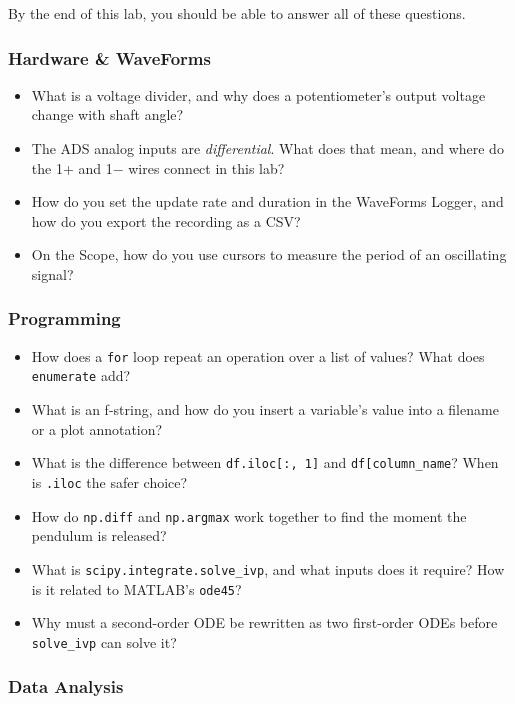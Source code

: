 \documentclass[
  12pt,
  letterpaper,
]{article}
\providecommand{\tightlist}{%
  \setlength{\itemsep}{0pt}\setlength{\parskip}{0pt}}
\begin{document}
By the end of this lab, you should be able to answer all of these
questions.

\subsubsection{Hardware \& WaveForms}\label{hardware-waveforms}

\begin{itemize}
\tightlist
\item
  What is a voltage divider, and why does a potentiometer's output
  voltage change with shaft angle?
\item
  The ADS analog inputs are \emph{differential}. What does that mean,
  and where do the 1+ and 1− wires connect in this lab?
\item
  How do you set the update rate and duration in the WaveForms Logger,
  and how do you export the recording as a CSV?
\item
  On the Scope, how do you use cursors to measure the period of an
  oscillating signal?
\end{itemize}

\subsubsection{Programming}\label{programming}

\begin{itemize}
\tightlist
\item
  How does a \texttt{for} loop repeat an operation over a list of
  values? What does \texttt{enumerate} add?
\item
  What is an f-string, and how do you insert a variable's value into a
  filename or a plot annotation?
\item
  What is the difference between \texttt{df.iloc{[}:,\ 1{]}} and
  \texttt{df{[}\textquotesingle{}column\_name\textquotesingle{}{]}}?
  When is \texttt{.iloc} the safer choice?
\item
  How do \texttt{np.diff} and \texttt{np.argmax} work together to find
  the moment the pendulum is released?
\item
  What is \texttt{scipy.integrate.solve\_ivp}, and what inputs does it
  require? How is it related to MATLAB's \texttt{ode45}?
\item
  Why must a second-order ODE be rewritten as two first-order ODEs
  before \texttt{solve\_ivp} can solve it?
\end{itemize}

\subsubsection{Data Analysis}\label{data-analysis}
\end{document}
